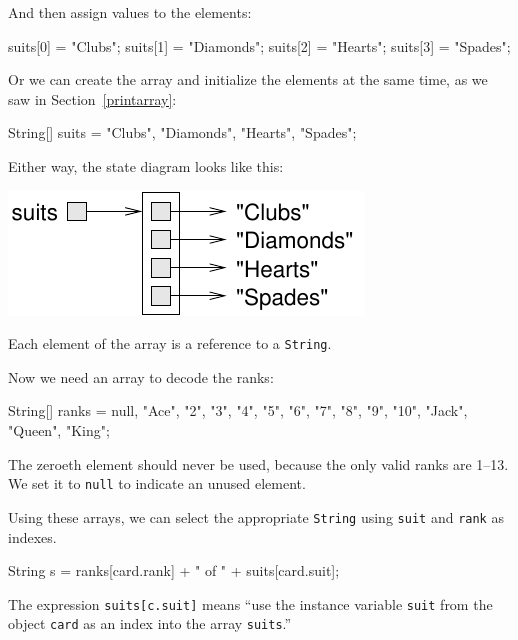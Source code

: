 \documentclass[12pt]{book}
\theoremstyle{exercise}
\newcommand{\java}[1]{\verb"#1"}
\newcommand{\java}[1]{\lstinline{#1}} %
\begin{document}
And then assign values to the elements:

\begin{code}
    suits[0] = "Clubs";
    suits[1] = "Diamonds";
    suits[2] = "Hearts";
    suits[3] = "Spades";
\end{code}

Or we can create the array and initialize the elements at the same time, as we saw in Section~\ref{printarray}:

\begin{code}
    String[] suits = {"Clubs", "Diamonds", "Hearts", "Spades"};
\end{code}


Either way, the state diagram looks like this:

\begin{center}
\includegraphics{figs/stringarray.pdf}
\end{center}


Each element of the array is a reference to a \java{String}.

Now we need an array to decode the ranks:

\begin{code}
    String[] ranks = {null, "Ace", "2", "3", "4", "5", "6",
               "7", "8", "9", "10", "Jack", "Queen", "King"};
\end{code}

The zeroeth element should never be used, because the only valid ranks are 1--13.
We set it to \java{null} to indicate an unused element.

Using these arrays, we can select the appropriate \java{String} using \java{suit} and \java{rank} as indexes.

\begin{code}
    String s = ranks[card.rank] + " of " + suits[card.suit];
\end{code}

The expression \java{suits[c.suit]} means ``use the instance variable \java{suit} from the object \java{card} as an index into the array \java{suits}.''
\end{document}
